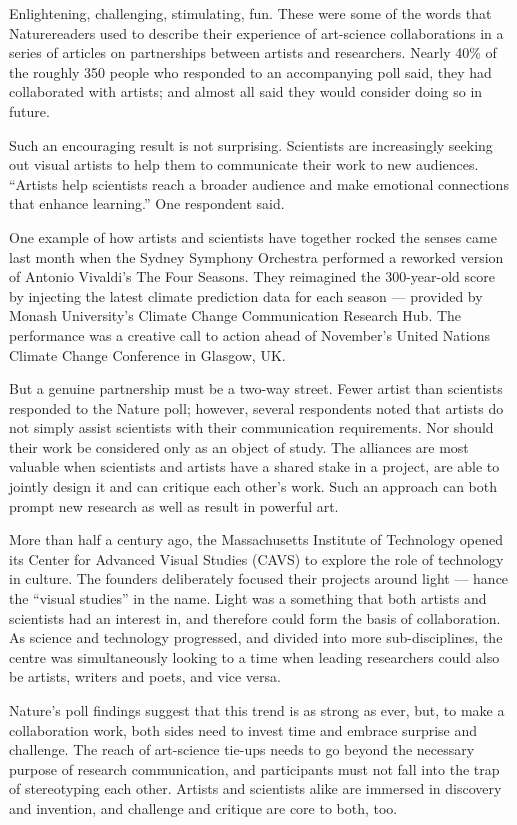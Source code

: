 Enlightening, challenging, stimulating, fun. These were some of the words that Naturereaders used to describe their experience of art-science collaborations in a series of articles on partnerships between artists and researchers. Nearly 40\% of the roughly 350 people who responded to an accompanying poll said, they had collaborated with artists; and almost all said they would consider doing so in future.


Such an encouraging result is not surprising. Scientists are increasingly seeking out visual artists to help them to communicate their work to new audiences. ``Artists help scientists reach a broader audience and make emotional connections that enhance learning.'' One respondent said.


One example of how artists and scientists have together rocked the senses came last month when the Sydney Symphony Orchestra performed a reworked version of Antonio Vivaldi's The Four Seasons. They reimagined the 300-year-old score by injecting the latest climate prediction data for each season — provided by Monash University's Climate Change Communication Research Hub. The performance was a creative call to action ahead of November's United Nations Climate Change Conference in Glasgow, UK.


But a genuine partnership must be a two-way street. Fewer artist than scientists responded to the Nature poll; however, several respondents noted that artists do not simply assist scientists with their communication requirements. Nor should their work be considered only as an object of study. The alliances are most valuable when scientists and artists have a shared stake in a project, are able to jointly design it and can critique each other's work. Such an approach can both prompt new research as well as result in powerful art.


More than half a century ago, the Massachusetts Institute of Technology opened its Center for Advanced Visual Studies (CAVS) to explore the role of technology in culture. The founders deliberately focused their projects around light — hance the ``visual studies'' in the name. Light was a something that both artists and scientists had an interest in, and therefore could form the basis of collaboration. As science and technology progressed, and divided into more sub-disciplines, the centre was simultaneously looking to a time when leading researchers could also be artists, writers and poets, and vice versa.


Nature's poll findings suggest that this trend is as strong as ever, but, to make a collaboration work, both sides need to invest time and embrace surprise and challenge. The reach of art-science tie-ups needs to go beyond the necessary purpose of research communication, and participants must not fall into the trap of stereotyping each other. Artists and scientists alike are immersed in discovery and invention, and challenge and critique are core to both, too. 